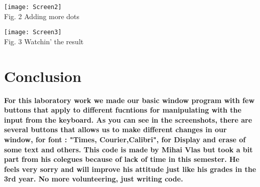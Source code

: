\documentclass[12pt]{article}
\begin{document}
    \begin{minipage}[b]{1.0\linewidth}
      \begin{center}
        \texttt{[image: Screen2]}
         \\ Fig. 2 Adding more dots
      \end{center}
    \end{minipage}
    \begin{minipage}[b]{1.0\linewidth}
      \begin{center}
        \texttt{[image: Screen3]}
         \\ Fig. 3 Watchin' the result
      \end{center}
    \end{minipage}
    
     
\section{Conclusion}

\textbf{For this laboratory work we made our basic window program with few buttons that apply to different fucntions for manipulating with the input from the keyboard. As you can see in the screenshots, there are several buttons that allows us to make different changes in our window, for font : "Times, Courier,Calibri", for Display and erase of some text and others. This code is made by Mihai Vlas but took a bit part from his colegues because of lack of time in this semester. He feels very sorry and will improve his attitude just like his grades in the 3rd year. No more volunteering, just writing code.}

  
\end{document}
